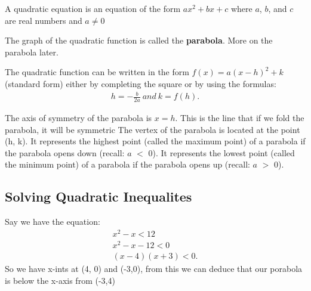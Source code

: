 \documentclass{report}
\begin{document}
    \bigbreak \noindent 
    A quadratic equation is an equation of the form $ax^{2} +bx + c$ where $a$, $b$, and $c$ are real
    numbers and $a \neq 0$

    \bigbreak \noindent 
    The graph of the quadratic function is called the \textbf{parabola}. More on the parabola later.

    \bigbreak \noindent 
    The quadratic function can be written in the form $f(x) =a(x-h)^{2}  + k$  (standard form) either by completing
    the square or by using the formulas:
    \begin{align*}
      h = -\frac{b}{2a}\ and\ k=f(h)
    .\end{align*}

  \bigbreak \noindent 
  The axis of symmetry of the parabola is $x=h$. This is the line that if we fold the parabola, it will be symmetric
  The vertex of the parabola is located at the point (h, k).
  It represents the highest point (called the maximum point) of a parabola if the parabola opens
  down (recall: $a$ $<$ 0).
  It represents the lowest point (called the minimum point) of a parabola if the parabola opens up
  (recall: $a$ $>$ 0).

  \bigbreak \noindent 

  \bigbreak \noindent \bigbreak \noindent 
  \subsection{Solving Quadratic Inequalites}
  Say we have the equation:
  \begin{align*}
    x^{2} -x < 12 \\
    x^{2} -x -12 < 0  \\
    (x-4)(x+3) < 0
   .\end{align*}
    So we have x-ints at (4, 0) and (-3,0), from this we can deduce that our porabola is below the x-axis from (-3,4)
\end{document}
